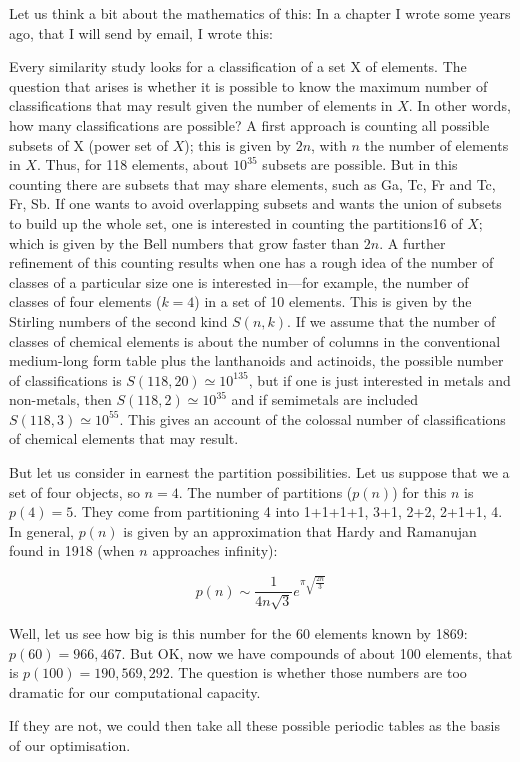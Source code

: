 \documentclass[]{article}
\newcommand{\gr}[1]{{\color{red}#1}}
\begin{document}
\gr{Let us think a bit about the mathematics of this:
In a chapter I wrote some years ago, that I will send by email, I wrote this:

Every similarity study looks for a classification of a set X of elements. The
question that arises is whether it is possible to know the maximum number of
classifications that may result given the number of elements in $X$. In other
words, how many classifications are possible? A first approach is counting all
possible subsets of X (power set of $X$); this is given by $2n$, with $n$ the number of
elements in $X$. Thus, for 118 elements, about $10^{35}$ subsets are possible. But in
this counting there are subsets that may share elements, such as {Ga, Tc, Fr}
and {Tc, Fr, Sb}. If one wants to avoid overlapping subsets and wants the
union of subsets to build up the whole set, one is interested in counting the
partitions16 of $X$; which is given by the Bell numbers that grow faster than $2n$.
A further refinement of this counting results when one has a rough idea of the
number of classes of a particular size one is interested in—for example, the number of classes of four elements ($k = 4$) in a set of 10 elements. This is
given by the Stirling numbers of the second kind $S(n,k)$. If we
assume that the number of classes of chemical elements is about the number
of columns in the conventional medium-long form table plus
the lanthanoids and actinoids, the possible number of classifications is $S(118,
20) \simeq 10^{135}$, but if one is just interested in metals and non-metals, then $S(118,
2) \simeq 10^{35}$ and if semimetals are included $S(118, 3) \simeq 10^{55}$. This gives an account
of the colossal number of classifications of chemical elements that may result.

But let us consider in earnest the partition possibilities.  Let us suppose that we a set of four objects, so $n=4$.  The number of partitions ($p(n)$) for this $n$ is $p(4)=5$.  They come from partitioning 4 into 1+1+1+1, 3+1, 2+2, 2+1+1, 4.  In general, $p(n)$ is given by an approximation that Hardy and Ramanujan found in 1918 (when $n$ approaches infinity):

\[
p(n)\sim \frac{1}{4n\sqrt{3}}e^{\pi\sqrt{\frac{2n}{3}}}
\]

Well, let us see how big is this number for the 60 elements known by 1869:  $p(60)=966,467$.  But OK, now we have compounds of about 100 elements, that is $p(100)=190,569,292$.  The question is whether those numbers are too dramatic for our computational capacity.

If they are not, we could then take all these possible periodic tables as the basis of our optimisation.

}
\end{document}
